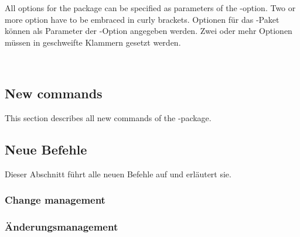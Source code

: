
\ifENGLISH
	All options for the  package can be specified as parameters of the -option.
	Two or more option have to be embraced in curly brackets.
\fi
	\ifGERMAN
		Optionen für das -Paket können als Parameter der -Option angegeben werden.
		Zwei oder mehr Optionen müssen in geschweifte Klammern gesetzt werden.
	\fi

\\

\ifENGLISH
	\subsection{New commands}

	This section describes all new commands of the -package.
\fi
	\ifGERMAN
		\subsection{Neue Befehle}

		Dieser Abschnitt führt alle neuen Befehle auf und erläutert sie.
	\fi

\ifENGLISH
	\subsubsection{Change management}
\fi
	\ifGERMAN
		\subsubsection{Änderungsmanagement}
	\fi

